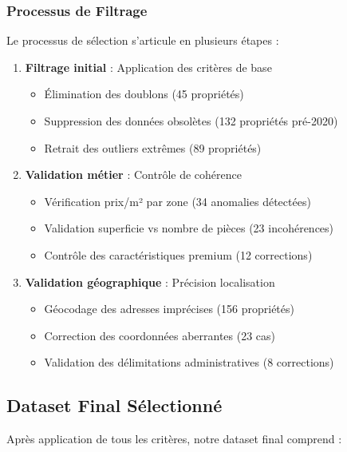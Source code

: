 \subsubsection{Processus de Filtrage}

Le processus de sélection s'articule en plusieurs étapes :

\begin{enumerate}
    \item \textbf{Filtrage initial} : Application des critères de base
    \begin{itemize}
        \item Élimination des doublons (45 propriétés)
        \item Suppression des données obsolètes (132 propriétés pré-2020)
        \item Retrait des outliers extrêmes (89 propriétés)
    \end{itemize}
    
    \item \textbf{Validation métier} : Contrôle de cohérence
    \begin{itemize}
        \item Vérification prix/m² par zone (34 anomalies détectées)
        \item Validation superficie vs nombre de pièces (23 incohérences)
        \item Contrôle des caractéristiques premium (12 corrections)
    \end{itemize}
    
    \item \textbf{Validation géographique} : Précision localisation
    \begin{itemize}
        \item Géocodage des adresses imprécises (156 propriétés)
        \item Correction des coordonnées aberrantes (23 cas)
        \item Validation des délimitations administratives (8 corrections)
    \end{itemize}
\end{enumerate}

\subsection{Dataset Final Sélectionné}
\label{subsec:dataset_final_selectionne}

Après application de tous les critères, notre dataset final comprend :

